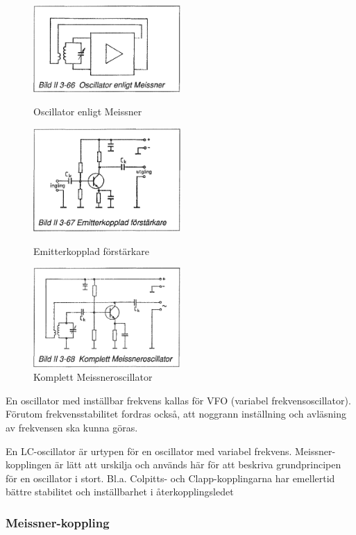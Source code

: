 \begin{figure}
  \includegraphics[width=0.5\textwidth]{images/bild_2_3-66}
  \caption{Oscillator enligt Meissner}
  \label{fig:BildII3-66}

  \includegraphics[width=0.5\textwidth]{images/bild_2_3-67}
  \caption{Emitterkopplad förstärkare}
  \label{fig:BildII3-67}

  \includegraphics[width=0.5\textwidth]{images/bild_2_3-68}
  \caption{Komplett Meissneroscillator}
  \label{fig:BildII3-68}
\end{figure}

En oscillator med inställbar frekvens kallas för VFO (variabel
frekvensoscillator). Förutom frekvensstabilitet fordras också, att
noggrann inställning och avläsning av frekvensen ska kunna göras.

En LC-oscillator är urtypen för en oscillator med variabel
frekvens. Meissner-kopplingen är lätt att urskilja och används här för
att beskriva grundprincipen för en oscillator i stort. Bl.a. Colpitts-
och Clapp-kopplingarna har emellertid bättre stabilitet och
inställbarhet i återkopplingsledet

\subsubsection{Meissner-koppling}

